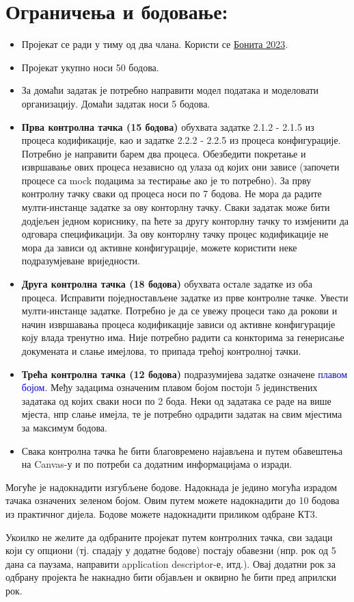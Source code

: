 \documentclass[12pt,a4paper]{article}
\newcommand{\optional}[1]{\textcolor{blue}{#1}}
\newcommand{\bonus}[1]{\textcolor{emerald}{#1}}
\begin{document}
\section{Ограничења и бодовање:}

\begin{itemize}
    \item Пројекат се ради у тиму од два члана. Користи се \href{https://www.bonitasoft.com/old-versions}{Бонита 2023}.
    \item Пројекат укупно носи 50 бодова.
    \item За домаћи задатак је потребно направити модел података и моделовати организацију. Домаћи задатак носи 5 бодова.
    \item \textbf{Прва контролна тачка (15 бодова)} обухвата задатке 2.1.2 - 2.1.5 из процеса кодификације, као и задатке 2.2.2 - 2.2.5 из процеса конфигурације. Потребно је направити барем два процеса. Обезбедити покретање и извршавање ових процеса независно од улаза од којих они зависе (започети процесе са mock подацима за тестирање ако је то потребно). За прву контролну тачку сваки од процеса носи по 7 бодова. Не мора да радите мулти-инстанце задатке за ову конторлну тачку. Сваки задатак може бити додјељен једном кориснику, па ћете за другу конторлну тачку то измјенити да одговара спецификацији. За ову конторлну тачку процес кодификације не мора да зависи од активне конфигурације, можете користити неке подразумјеване вриједности.
    \item \textbf{Друга контролна тачка (18 бодова)} обухвата остале задатке из оба процеса. Исправити поједностављене задатке из прве контролне тачке. Увести мулти-инстанце задатке. Потребно је да се увежу процеси тако да рокови и начин извршавања процеса кодификације зависи од активне конфигурације коју влада тренутно има. Није потребно радити са конкторима за генерисање докумената и слање имејлова, то припада трећој контролној тачки.
    \item \textbf{Трећа контролна тачка (12 бодова)} подразумијева задатке означене \optional{плавом бојом}. Међу задацима означеним плавом бојом постоји 5 јединствених задатака од којих сваки носи по 2 бода. Неки од задатака се раде на више мјеста, нпр слање имејла, те је потребно одрадити задатак на свим мјестима за максимум бодова.
    \item Свака контролна тачка ће бити благовремено најављена и путем обавештења на Canvas-у и по потреби са додатним информацијама о изради.
\end{itemize}

Могуће је надокнадити изгубљене бодове. Надокнада је једино могућа израдом тачака означених \bonus{зеленом бојом}. Овим путем можете надокнадити до 10 бодова из практичног дијела. Бодове можете надокнадити приликом одбране КТ3.

Укоилко не желите да одбраните пројекат путем контролних тачка, сви задаци који су опциони (тј. спадају у додатне бодове) постају обавезни (нпр. рок од 5 дана са паузама, направити application descriptor-е, итд.). Овај додатни рок за одбрану пројекта ће накнадно бити објављен и оквирно ће бити пред априлски рок.
\end{document}
